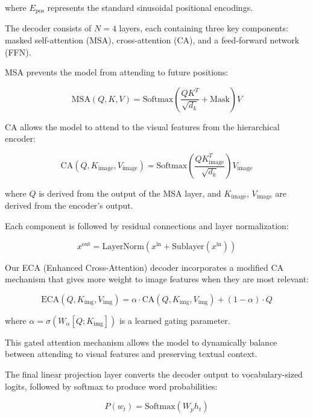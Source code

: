 \documentclass[10pt,twocolumn,letterpaper]{article}
\begin{document}
where $E_{\text{pos}}$ represents the standard sinusoidal positional encodings.

The decoder consists of $N=4$ layers, each containing three key components: masked self-attention (MSA), cross-attention (CA), and a feed-forward network (FFN). 

MSA prevents the model from attending to future positions:

\begin{equation}
\text{MSA}(Q, K, V) = \text{Softmax}\left(\frac{QK^T}{\sqrt{d_k}} + \text{Mask}\right)V
\end{equation}

CA allows the model to attend to the visual features from the hierarchical encoder:

\begin{equation}
\text{CA}(Q, K_{\text{image}}, V_{\text{image}}) = \text{Softmax}\left(\frac{QK_{\text{image}}^T}{\sqrt{d_k}}\right)V_{\text{image}}
\end{equation}

where $Q$ is derived from the output of the MSA layer, and $K_{\text{image}}$, $V_{\text{image}}$ are derived from the encoder's output.

Each component is followed by residual connections and layer normalization:

\begin{equation}
x^{\text{out}} = \text{LayerNorm}(x^{\text{in}} + \text{Sublayer}(x^{\text{in}}))
\end{equation}

Our ECA (Enhanced Cross-Attention) decoder incorporates a modified CA mechanism that gives more weight to image features when they are most relevant:

\begin{equation}
\text{ECA}(Q, K_{\text{img}}, V_{\text{img}}) = \alpha \cdot \text{CA}(Q, K_{\text{img}}, V_{\text{img}}) + (1-\alpha) \cdot Q
\end{equation}

where $\alpha = \sigma(W_{\alpha}[Q; K_{\text{img}}])$ is a learned gating parameter.

This gated attention mechanism allows the model to dynamically balance between attending to visual features and preserving textual context.

The final linear projection layer converts the decoder output to vocabulary-sized logits, followed by softmax to produce word probabilities:

\begin{equation}
P(w_t) = \text{Softmax}(W_p h_t)
\end{equation}
\end{document}
